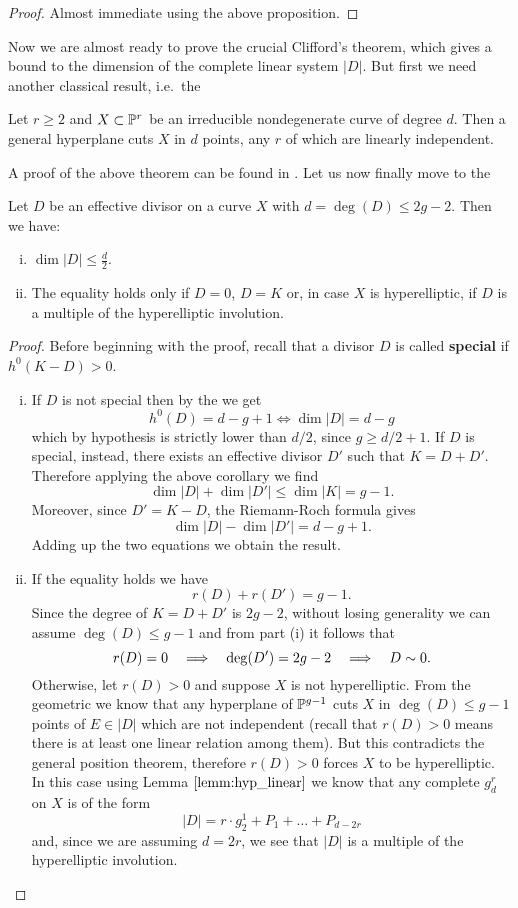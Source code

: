 	\begin{proof}
		Almost immediate using the above proposition.
	\end{proof}
	Now we are almost ready to prove the crucial Clifford's theorem, which gives a bound to the dimension of the complete linear system $|D|$. But first we need another classical result, i.e.\ the
	\begin{namedtheo}\label{thm:GPT}
		Let $r\geq 2$ and $X\subset \mathbb{P}^r$ be an irreducible nondegenerate curve of degree $d$. Then a general hyperplane cuts $X$ in $d$	points, any $r$ of which are linearly independent.
	\end{namedtheo}
	A proof of the above theorem can be found in \cite{GAC}. Let us now finally move to the
	\begin{namedtheo}\label{thm:Clifford}
		Let $D$ be an effective divisor on a curve $X$ with $d = \deg(D) \leq 2g-2$. Then we have:
		\begin{enumerate}[(i)]
			\item $ \dim|D| \leq \frac{d}{2}. $
			\item The equality holds only if $D=0$, $D=K$ or, in case $X$ is hyperelliptic, if $D$ is a multiple of the hyperelliptic involution.
		\end{enumerate}
	\end{namedtheo}
	\begin{proof}
		Before beginning with the proof, recall that a divisor $D$ is called \textbf{special} if $h^0(K-D) > 0$.
		\begin{enumerate}[(i)]
			\item If $D$ is not special then by the \RR we get
			$$ h^0(D) = d-g+1 \iff \dim|D| = d-g $$
			which by hypothesis is strictly lower than $d/2$, since $g \geq d/2+1 $. If $D$ is special, instead, there exists an effective divisor $D'$ such that $K=D+D'$. Therefore applying the above corollary we find
			$$ \dim|D| + \dim|D'| \leq \dim|K| = g-1.  $$
			Moreover, since $D' = K-D$, the Riemann-Roch formula gives
			$$ \dim|D| - \dim|D'| = d - g + 1. $$
			Adding up the two equations we obtain the result.
			
			\item If the equality holds we have
			$$ r(D) + r(D') = g-1.  $$
			Since the degree of $K=D+D'$ is $2g-2$, without losing generality we can assume $\deg(D)\leq g-1$ and from part (i) it follows that 
			$$ r(D)=0 \quad \Longrightarrow \quad \deg(D')=2g-2 \quad \Longrightarrow \quad D\sim 0. $$ 
			Otherwise, let $r(D)>0$ and suppose $X$ is not hyperelliptic. From the geometric \RR we know that any hyperplane of $\mathbb{P}^{g-1}$ cuts $X$ in $\deg(D)\leq g-1$ points of $E\in|D|$ which are not independent (recall that $r(D)>0$ means there is at least one linear relation among them). But this contradicts the general position theorem, therefore $r(D)>0$ forces $X$ to be hyperelliptic. In this case using Lemma $\ref{lemm:hyp_linear}$ we know that any complete $g_d^r$ on $X$ is of the form
			$$ |D| = r\cdot g_2^1 + P_1 + \dots + P_{d-2r} $$
			and, since we are assuming $d=2r$, we see that $|D|$ is a multiple of the hyperelliptic involution.
		\end{enumerate}
	\end{proof}

